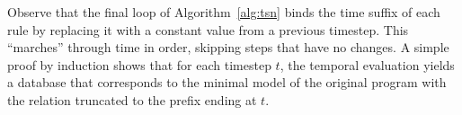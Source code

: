 Observe that the final loop of Algorithm~\ref{alg:tsn} binds the time suffix of each rule by replacing it with a constant value from a previous timestep.  This ``marches'' through time in order, skipping steps that have no changes.  A simple proof by induction shows that for each timestep $t$, the temporal evaluation yields a database that corresponds to the minimal model of the original \slang program with the  relation truncated to the prefix ending at $t$.